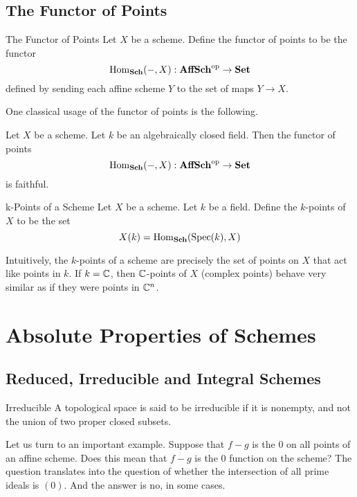 \documentclass[a4paper]{article}
\begin{document}
\subsection{The Functor of Points}
\begin{defn}{The Functor of Points}{} Let $X$ be a scheme. Define the functor of points to be the functor $$\operatorname{Hom}_\bold{Sch}(-,X):\bold{AffSch}^\text{op}\to\bold{Set}$$ defined by sending each affine scheme $Y$ to the set of maps $Y\to X$. 
\end{defn}

One classical usage of the functor of points is the following. 

\begin{lmm}{}{} Let $X$ be a scheme. Let $k$ be an algebraically closed field. Then the functor of points $$\operatorname{Hom}_\bold{Sch}(-,X):\bold{AffSch}^\text{op}\to\bold{Set}$$ is faithful. 
\end{lmm}

\begin{defn}{k-Points of a Scheme}{} Let $X$ be a scheme. Let $k$ be a field. Define the $k$-points of $X$ to be the set $$X(k)=\operatorname{Hom}_\bold{Sch}(\text{Spec}(k),X)$$
\end{defn}

Intuitively, the $k$-points of a scheme are precisely the set of points on $X$ that act like points in $k$. If $k=\mathbb{C}$, then $\mathbb{C}$-points of $X$ (complex points) behave very similar as if they were points in $\mathbb{C}^n$. 

\pagebreak
\section{Absolute Properties of Schemes}
\subsection{Reduced, Irreducible and Integral Schemes}
\begin{defn}{Irreducible}{} A topological space is said to be irreducible if it is nonempty, and not the union of two proper closed subsets. 
\end{defn}

Let us turn to an important example. Suppose that $f-g$ is the $0$ on all points of an affine scheme. Does this mean that $f-g$ is the $0$ function on the scheme? The question translates into the question of whether the intersection of all prime ideals is $(0)$. And the answer is no, in some cases. \\~\\
\end{document}
